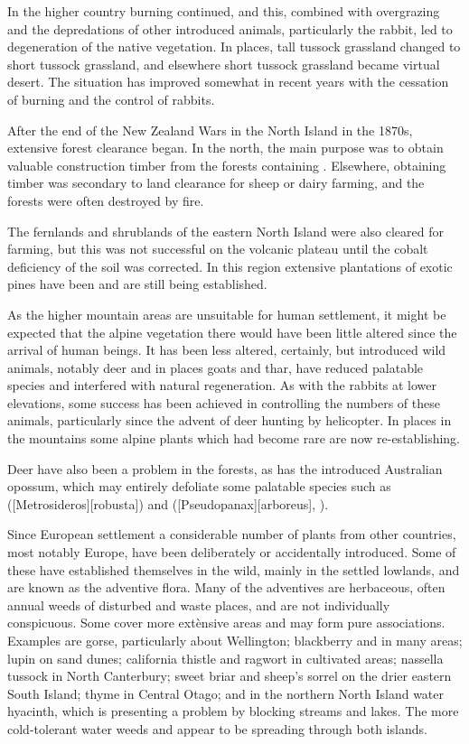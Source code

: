 In the higher country burning continued, and this, combined with overgrazing and the depredations of other introduced animals, particularly the rabbit, led to degeneration of the native vegetation.
In places, tall tussock grassland changed to short tussock grassland, and elsewhere short tussock grassland became virtual desert.
The situation has improved somewhat in recent years with the cessation of burning and the control of rabbits.

After the end of the New Zealand Wars in the North Island in the 1870s, extensive forest clearance began.
In the north, the main purpose was to obtain valuable construction timber from the forests containing .
Elsewhere, obtaining timber was secondary to land clearance for sheep or dairy farming, and the forests were often destroyed by fire.

The fernlands and shrublands of the eastern North Island were also cleared for farming, but this was not successful on the volcanic plateau until the cobalt deficiency of the soil was corrected.
In this region extensive plantations of exotic pines have been and are still being established.

As the higher mountain areas are unsuitable for human settlement, it might be expected that the alpine vegetation there would have been little altered since the arrival of human beings.
It has been less altered, certainly, but introduced wild animals, notably deer and in places goats and thar, have reduced palatable species and interfered with natural regeneration.
As with the rabbits at lower elevations, some success has been achieved in controlling the numbers of these animals, particularly since the advent of deer hunting by helicopter.
In places in the mountains some alpine plants which had become rare are now re-establishing.

Deer have also been a problem in the forests, as has the introduced Australian opossum, which may entirely defoliate some palatable species such as  ([Metrosideros][robusta]) and  ([Pseudopanax][arboreus], ).

Since European settlement a considerable number of plants from other countries, most notably Europe, have been deliberately or accidentally introduced.
Some of these have established themselves in the wild, mainly in the settled lowlands, and are known as the adventive flora.
Many of the adventives are herbaceous, often annual weeds of disturbed and waste places, and are not individually conspicuous.
Some cover more extènsive areas and may form pure associations.
Examples are gorse, particularly about Wellington; blackberry and  in many areas; lupin on sand dunes; california thistle and ragwort in cultivated areas; nassella tussock in North Canterbury; sweet briar and sheep's sorrel on the drier eastern South Island; thyme in Central Otago; and in the northern North Island water hyacinth, which is presenting a problem by blocking streams and lakes.
The more cold-tolerant water weeds  and  appear to be spreading through both islands.

